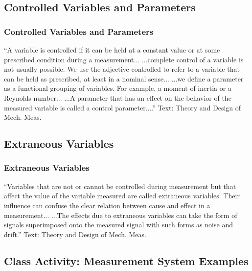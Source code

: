 \documentclass[fleqn]{beamer} %
\newcommand{\sectionIIsubsectionIIItitle}{Controlled Variables and Parameters}
\newcommand{\sectionIIsubsectionIVtitle}{Extraneous Variables}
\newcommand{\sectionIIsubsectionVtitle}{Class Activity: Measurement System Examples}
\begin{document}
		\subsection{\sectionIIsubsectionIIItitle}\label{sectionIIsubsectionIII}

			\begin{frame}
				\frametitle{\sectionIIsubsectionIIItitle}

				{``A variable is {\BL controlled} if it can be held at a constant value
				or at some prescribed condition during a measurement... ...complete control of a variable is not usually
				possible. We use the adjective {\BL controlled} to refer to a variable that can be held as prescribed, at
				least in a nominal sense... \vspc
				...we define a {\GR parameter} as a functional grouping of variables. For example, a moment of inertia or a Reynolds number... ...A {\GR parameter} that has an effect on the behavior of the measured variable is called a control parameter....''} \vspc
				{\tiny Text: Theory and Design of Mech. Meas.}

			\end{frame}

		\subsection{\sectionIIsubsectionIVtitle}\label{sectionIIsubsectionIV}

			\begin{frame}
				\frametitle{\sectionIIsubsectionIVtitle}

				{``Variables that are not or cannot be controlled during measurement but that affect the value of the
				variable measured are called {\RD extraneous variables}. Their influence can confuse the clear relation
				between cause and effect in a measurement... ...The effects due to {\RD extraneous variables} can take the form of signals superimposed
				onto the measured signal with such forms as {\PR noise} and drift.''} \vspc
				{\tiny Text: Theory and Design of Mech. Meas.}

			\end{frame}
		
		\subsection{\sectionIIsubsectionVtitle}\label{sectionIIsubsectionV}
\end{document}
